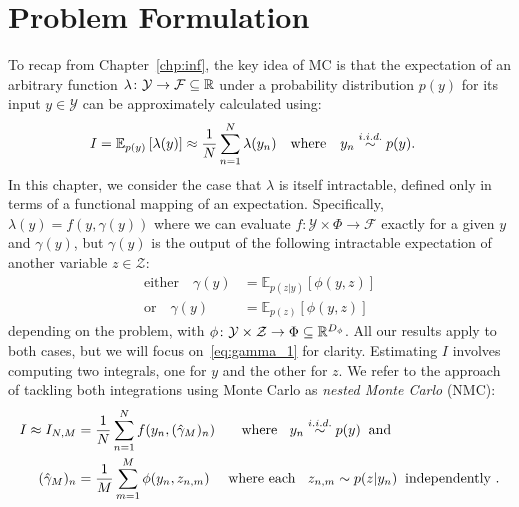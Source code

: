 
\section{Problem Formulation}
\label{sec:prob-form}

To recap from Chapter~\ref{chp:inf}, the key idea of MC is that the expectation of an arbitrary function 
$\lambda \colon \mathcal{Y} \rightarrow \mathcal{F} \subseteq \mathbb{R}$ under a probability distribution $p(y)$ for its input $y \in \mathcal{Y}$ can be approximately calculated using:
\begin{align}
\label{eq:MC}
I &= \mathbb{E}_{p(y)} \left[\lambda(y)\right]
\approx \frac{1}{N} \sum_{n=1}^{N} \lambda(y_n) \quad \text{where} \quad y_n \overset{i.i.d.}{\sim} p(y).
\end{align}
In this chapter, we consider the case that $\lambda$ is itself intractable, defined only in terms of a functional mapping of an expectation. Specifically, $\lambda(y) = f(y,\gamma(y))$
where we can evaluate $f \colon \mathcal{Y} \times \Phi \rightarrow \mathcal{F}$ exactly for a given $y$ and $\gamma (y)$, but $\gamma(y)$ is the output of the following 
intractable expectation of another variable $z \in \mathcal{Z}$:
\begin{subequations}
	\label{eq:gamma}
	\begin{align}
	\label{eq:gamma_1}
	\text{either}\quad
	\gamma(y) &=  \mathbb{E}_{p(z | y)} \left[\phi(y,z)\right] \\
	\label{eq:gamma_2}
	\text{or} \quad \gamma(y) &= \mathbb{E}_{p(z)} \left[\phi(y,z)\right]
	\end{align}
\end{subequations}
depending on the problem, with $\phi \colon \mathcal{Y} \times \mathcal{Z} \rightarrow \Phi \subseteq \mathbb{R}^{D_{\phi}}$.
All our results apply to both cases, but we will focus on~\eqref{eq:gamma_1} for clarity.
Estimating $I$ involves computing two integrals, one for $y$ and the other for $z$. 
We refer to the approach of tackling both integrations using Monte Carlo 
as \emph{nested Monte Carlo} (NMC):
\begin{subequations}
\label{eq:nested-mc}
\begin{align}
I \approx I_{N,M} &= \frac{1}{N}  \sum_{n=1}^{N} f(y_n,(\hat{\gamma}_M)_n) \label{eq:nested-outer} \quad \;\;  \text{ where } \;\; y_n \overset{i.i.d.}{\sim} p(y) \;\;  \text{and} \\
(\hat{\gamma}_M)_n &= \frac{1}{M}  \sum_{m=1}^{M}  \phi(y_n,z_{n,m}) \label{eq:nested-inner} \quad
\text{ where each } \;\; z_{n,m} \sim p(z | y_n) \;\; \text{independently }.
\end{align}
\end{subequations}
